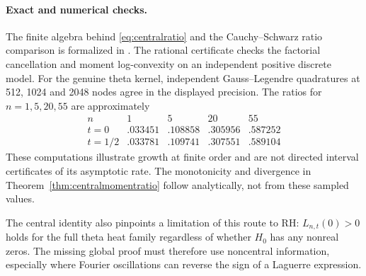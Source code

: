 \paragraph{Exact and numerical checks.}
The finite algebra behind
\eqref{eq:centralratio} and the
Cauchy--Schwarz ratio comparison is
formalized in
.
The rational certificate
checks the factorial cancellation and
moment log-convexity on an independent
positive discrete model.
For the genuine theta kernel, independent
Gauss--Legendre quadratures at 512, 1024
and 2048 nodes agree in the displayed
precision. The ratios for
$n=1,5,20,55$ are approximately
\[
\begin{array}{c|cccc}
n&1&5&20&55\\ \hline
t=0&.033451&.108858&.305956&.587252\\
t=1/2&.033781&.109741&.307551&.589104
\end{array}
\]
These computations illustrate growth
at finite order and are not directed
interval certificates of its asymptotic
rate. The monotonicity and divergence
in Theorem~\ref{thm:centralmomentratio}
follow analytically, not from
these sampled values.

The central identity also pinpoints a
limitation of this route to RH:
$L_{n,t}(0)>0$ holds for the full theta
heat family regardless of whether
$H_0$ has any nonreal zeros. The missing
global proof must therefore use
noncentral information, especially
where Fourier oscillations can reverse
the sign of a Laguerre expression.
